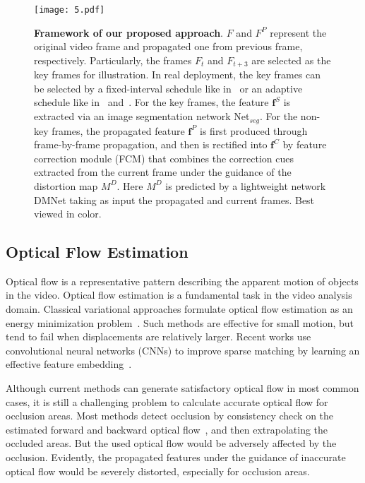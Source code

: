 \documentclass[journal]{IEEEtran}
\begin{document}
\begin{figure*}[t]
	\begin{center}
		\texttt{[image: 5.pdf]}
	\end{center}
	\caption{\textbf{Framework of our proposed approach}. $F$ and $F^{P}$ represent the original video frame and propagated one from previous frame, respectively. Particularly, the frames $F_{t}$ and $F_{t+3}$ are selected as the key frames for illustration. In real deployment, the key frames can be selected by a fixed-interval schedule like in~\cite{zhu2017deep} or an adaptive schedule like in~\cite{xu2018dynamic} and~\cite{li2018low}. For the key frames, the feature $\mathbf{f}^{S}$ is extracted via an image segmentation network Net$_{seg}$. For the non-key frames, the propagated feature $\mathbf{f}^{P}$ is first produced through frame-by-frame propagation, and then is rectified into $\mathbf{f}^{C}$ by feature correction module (FCM) that combines the correction cues extracted from the current frame under the guidance of the distortion map $M^{D}$. Here $M^{D}$ is predicted by a lightweight network DMNet taking as input the propagated and current frames. Best viewed in color.}
	\label{framework}
\end{figure*}

\subsection{Optical Flow Estimation}
Optical flow is a representative pattern describing the apparent motion of objects in the video. Optical flow estimation is a fundamental task in the video analysis domain. Classical variational approaches formulate optical flow estimation as an energy minimization problem~\cite{horn1981determining,anguita2009optimization}. Such methods are effective for small motion, but tend to fail when displacements are relatively larger. Recent works use convolutional neural networks (CNNs) to improve sparse matching by learning an effective feature embedding~\cite{dosovitskiy2015flownet,ilg2017flownet,sun2018pwc,zhai2019optical}. 

Although current methods can generate satisfactory optical flow in most common cases, it is still a challenging problem to calculate accurate optical flow for occlusion areas. Most methods detect occlusion by consistency check on the estimated forward and backward optical flow~\cite{chen2016full,sundaram2010dense}, and then extrapolating the occluded areas. But the used optical flow would be adversely affected by the occlusion. Evidently, the propagated features under the guidance of inaccurate optical flow would be severely distorted, especially for occlusion areas. 
\end{document}
